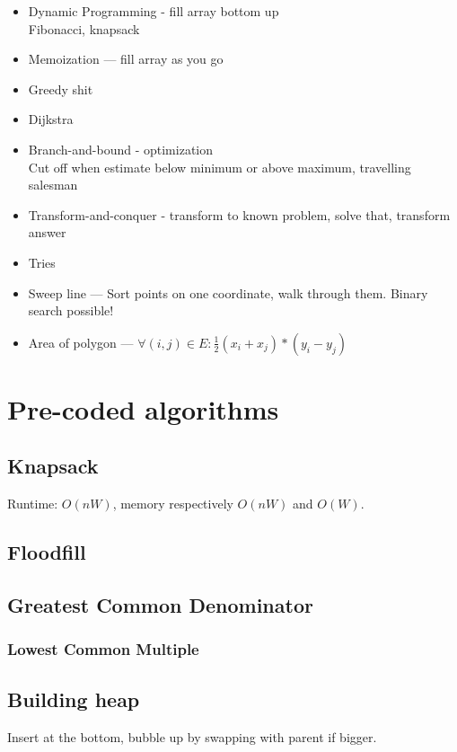 \documentclass[10pt,hidelinks]{article}
\begin{document}
\begin{itemize}
\item Dynamic Programming - fill array bottom up \\
	Fibonacci, knapsack
\item Memoization --- fill array as you go
\item Greedy shit
\item Dijkstra
\item Branch-and-bound - optimization \\
	Cut off when estimate below minimum or above maximum, travelling salesman
\item Transform-and-conquer - transform to known problem, solve that, transform answer
\item Tries
\item Sweep line --- Sort points on one coordinate, walk through them. Binary search possible!
\item Area of polygon --- $\forall (i, j) \in E: \frac12 (x_i+x_j)*(y_i-y_j)$
\end{itemize}

\pagebreak

\section{Pre-coded algorithms}

\subsection{Knapsack}
Runtime: $O(nW)$, memory respectively $O(nW)$ and $O(W)$.


\subsection{Floodfill}


\subsection{Greatest Common Denominator}


\subsubsection{Lowest Common Multiple}


\subsection{Building heap}
Insert at the bottom, bubble up by swapping with parent if bigger.
\end{document}
